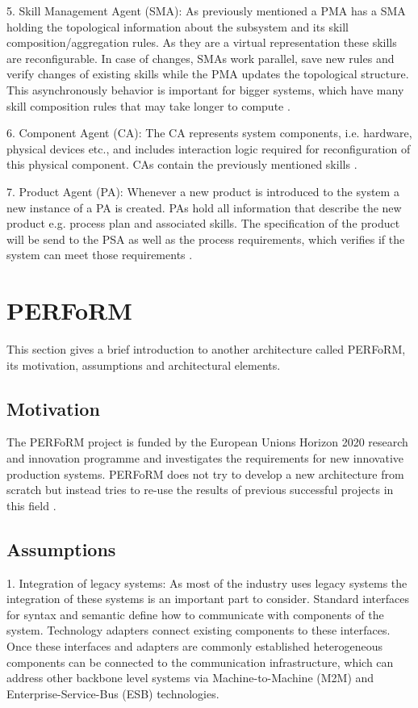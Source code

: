 \documentclass[conference,compsoc,hidelinks]{IEEEtran}
\begin{document}
5. Skill Management Agent (SMA): As previously mentioned a PMA has a SMA holding the topological information about the subsystem and its skill composition/aggregation rules. As they are a virtual representation these skills are reconfigurable. In case of changes, SMAs work parallel, save new rules and verify changes of existing skills while the PMA updates the topological structure. This asynchronously behavior is important for bigger systems, which have many skill composition rules that may take longer to compute \cite{Hybrid}.

6. Component Agent (CA): The CA represents system components, i.e. hardware, physical devices etc., and includes interaction logic required for reconfiguration of this physical component. CAs contain the previously mentioned skills \cite{Hybrid}.

7. Product Agent (PA): Whenever a new product is introduced to the system a new instance of a PA is created. PAs hold all information that describe the new product e.g. process plan and associated skills. The specification of the product will be send to the PSA as well as the process requirements, which verifies if the system can meet those requirements \cite{Hybrid}. 

\section{PERFoRM} \label{sec:PERFoRM} %
This section gives a brief introduction to another architecture called PERFoRM, its motivation, assumptions and architectural elements.

\subsection{Motivation}
The PERFoRM project is funded by the European Unions Horizon 2020 research and innovation programme and investigates the requirements for new innovative production systems. PERFoRM does not try to develop a new architecture from scratch but instead tries to re-use the results of previous successful projects in this field \cite{SpecPERFoRM}. 

\subsection{Assumptions}
1. Integration of legacy systems: As most of the industry uses legacy systems the integration of these systems is an important part to consider. Standard interfaces for syntax and semantic define how to communicate with components of the system. Technology adapters connect existing components to these interfaces. Once these interfaces and adapters are commonly established heterogeneous components can be connected to the communication infrastructure, which can address other backbone level systems via Machine-to-Machine (M2M) and Enterprise-Service-Bus (ESB) technologies.
\end{document}
